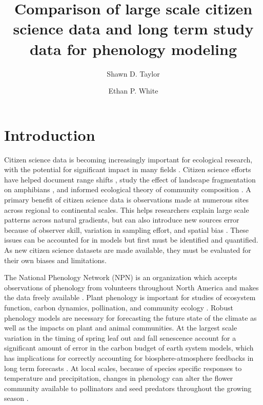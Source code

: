 \documentclass[fleqn,10pt,lineno]{wlpeerj} %
\title{Comparison of large scale citizen science data and long term study data for phenology modeling}
\author[1]{Shawn D. Taylor}
\author[2]{Ethan P. White}
\affil[1]{UFL}
\affil[2]{UFL}
\begin{document}
\flushbottom
\maketitle
\thispagestyle{empty}

\section*{Introduction}

Citizen science data is becoming increasingly important for ecological research, with the potential for significant impact in many fields \citep{dickinson2010, tulloch2013, kelling2009}. Citizen science efforts have helped document range shifts \citep{hitch2007}, study the effect of landscape fragmentation on amphibians \citep{cosentino2014}, and informed ecological theory of community composition \citep{locey2013}. A primary benefit of citizen science data is observations made at numerous sites across regional to continental scales. This helps researchers explain large scale patterns across natural gradients, but can also introduce new sources error because of observer skill, variation in sampling effort, and spatial bias \citep{dickinson2010}. These issues can be accounted for in models but first must be identified and quantified. As new citizen science datasets are made available, they must be evaluated for their own biases and limitations.  

The National Phenology Network (NPN) is an organization which accepts observations of phenology from volunteers throughout North America and makes the data freely available \citep{schwartz2012a}. Plant phenology is important for studies of ecosystem function, carbon dynamics, pollination, and community ecology \citep{richardson2013, cleland2007, tang2016}. Robust phenology models are necessary for forecasting the future state of the climate as well as the impacts on plant and animal communities. At the largest scale variation in the timing of spring leaf out and fall senescence account for a significant amount of error in the carbon budget of earth system models, which has implications for correctly accounting for biosphere-atmosphere feedbacks in long term forecasts \citep{richardson2012}. At local scales, because of species specific responses to temperature and precipitation, changes in phenology can alter the flower community available to pollinators and seed predators throughout the growing season \citep{diez2012, caradonna2014, ogilvie2017, theobald2017}. 
\end{document}
